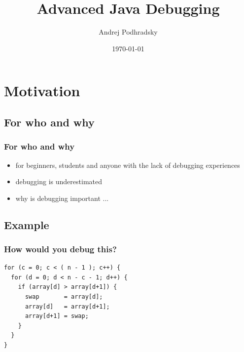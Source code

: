 \documentclass{beamer}
\begin{document}
\title{Advanced Java Debugging}   
\author{Andrej Podhradsky}
\date{\today} 



\frame{\titlepage} 


\section{Motivation}

\subsection{For who and why}
\begin{frame}[fragile]
\frametitle{For who and why}
\begin{itemize}
\item for beginners, students and anyone with the lack of debugging experiences
\item debugging is underestimated
\item why is debugging important ...
\end{itemize}
\end{frame}

\subsection{Example}
\begin{frame}[fragile]
\frametitle{How would you debug this?}
\begin{lstlisting}
for (c = 0; c < ( n - 1 ); c++) {
  for (d = 0; d < n - c - 1; d++) {
    if (array[d] > array[d+1]) {
      swap       = array[d];
      array[d]   = array[d+1];
      array[d+1] = swap;
    }
  }
}
\end{lstlisting}
\end{frame}
\end{document}
